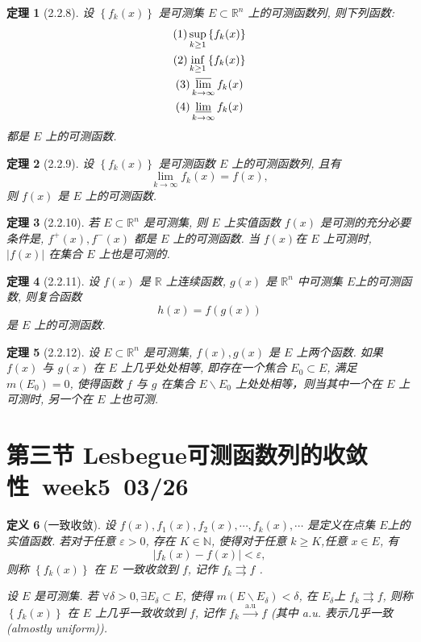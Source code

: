 \documentclass[10pt,openany]{book}
\theoremstyle{thmstyle} %
\newtheorem{theorem}{定理}[chapter]
\theoremstyle{defstyle} %
\newtheorem{definition}[theorem]{定义}
\theoremstyle{prostyle} %
\begin{document}
\begin{theorem}[2.2.8]
设 $\left\{f_k(x)\right\}$ 是可测集 $E \subset \mathbb{R}^n$ 上的可测函数列, 则下列函数:
$$
\begin{gathered}
(1) \sup _{k \geq 1}\left\{f_k(x)\right\} \\
(2) \inf _{k \geq 1}\left\{f_k(x)\right\} \\
(3) \varlimsup_{k \rightarrow \infty} f_k(x) \\
(4) \varliminf_{k \rightarrow \infty} f_k(x) 
\end{gathered}
$$
都是 $E$ 上的可测函数.
\end{theorem}

\begin{theorem}[2.2.9]
设 $\left\{f_k(x)\right\}$ 是可测函数 $E$ 上的可测函数列, 且有
$$
\lim _{k \rightarrow \infty} f_k(x)=f(x),
$$
则 $f(x)$ 是 $E$ 上的可测函数.
\end{theorem}

\begin{theorem}[2.2.10]
若 $E \subset \mathbb{R}^n$ 是可测集, 则 $E$ 上实值函数 $f(x)$ 是可测的充分必要条件是, $f^{+}(x), f^{-}(x)$ 都是 $E$ 上的可测函数. 当 $f(x)$在 $E$ 上可测时, $|f(x)|$ 在集合 $E$ 上也是可测的.
\end{theorem}

\begin{theorem}[2.2.11]
设 $f(x)$ 是 $\mathbb{R}$ 上连续函数, $g(x)$ 是 $\mathbb{R}^n$ 中可测集 $E$上的可测函数, 则复合函数
$$
h(x)=f(g(x))
$$
是 $E$ 上的可测函数.
\end{theorem}

\begin{theorem}[2.2.12]
设 $E \subset \mathbb{R}^n$ 是可测集, $f(x), g(x)$ 是 $E$ 上两个函数. 如果 $f(x)$ 与 $g(x)$ 在 $E$ 上几乎处处相等, 即存在一个焦合 $E_0 \subset E$, 满足 $m\left(E_0\right)=0$, 使得函数 $f$ 与 $g$ 在集合 $E \backslash E_0$ 上处处相等，则当其中一个在 $E$ 上可测时, 另一个在 $E$ 上也可测.
\end{theorem}






\section{第三节 Lesbegue可测函数列的收敛性~week5~03/26}

\begin{definition}[一致收敛]
设 $f(x), f_1(x), f_2(x), \cdots, f_k(x), \cdots$ 是定义在点集 $E$上的实值函数. 若对于任意 $\varepsilon>0$, 存在 $K \in \mathbb{N}$, 使得对于任意 $k \geq K$,任意 $x \in E$, 有
\begin{equation}
\left|f_k(x)-f(x)\right|<\varepsilon,
\end{equation}
则称 $\left\{f_k(x)\right\}$ 在 $E$ 一致收敛到 $f$, 记作 $f_k \rightrightarrows f$ .

设 $E$ 是可测集. 若 $\forall \delta>0, \exists E_\delta \subset E$, 使得 $m\left(E \backslash E_\delta\right)<\delta$, 在 $E_\delta$上 $f_k \rightrightarrows f$, 则称 $\left\{f_k(x)\right\}$ 在 $E$ 上几乎一致收敛到 $f$, 记作 $f_k \xrightarrow{\text { a.u }} f$ (其中 a.u. 表示几乎一致 (almostly uniform)).
\end{definition}
\end{document}
